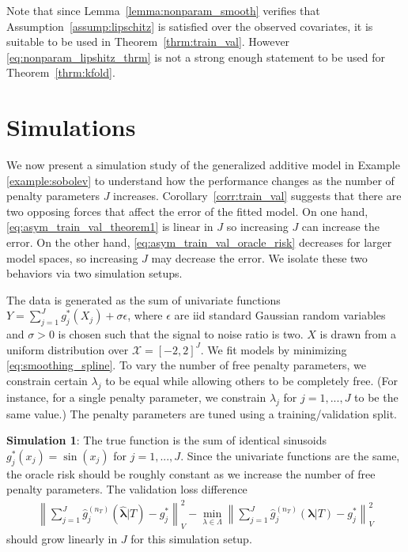 \documentclass[12pt]{article} %
\theoremstyle{definition}
\begin{document}
\noindent Note that since Lemma~\ref{lemma:nonparam_smooth} verifies that Assumption~\ref{assump:lipschitz} is satisfied over the observed covariates, it is suitable to be used in Theorem~\ref{thrm:train_val}.
However \eqref{eq:nonparam_lipshitz_thrm} is not a strong enough statement to be used for Theorem~\ref{thrm:kfold}.
%

\section{Simulations}\label{sec:simulations}

We now present a simulation study of the generalized additive model in Example \ref{example:sobolev} to understand how the performance changes as the number of penalty parameters $J$ increases.
Corollary~\ref{corr:train_val} suggests that there are two opposing forces that affect the error of the fitted model.
On one hand, \eqref{eq:asym_train_val_theorem1} is linear in $J$ so increasing $J$ can increase the error.
On the other hand, \eqref{eq:asym_train_val_oracle_risk} decreases for larger model spaces, so increasing $J$ may decrease the error.
We isolate these two behaviors via two simulation setups.

The data is generated as the sum of univariate functions
$Y = \sum_{j=1}^J g_j^*(X_j) + \sigma \epsilon$,
where $\epsilon$ are iid standard Gaussian random variables and $\sigma > 0$ is chosen such that the signal to noise ratio is two. $X$ is drawn from a uniform distribution over $\mathcal{X} = [-2, 2]^J$.
We fit models by minimizing \eqref{eq:smoothing_spline}.
To vary the number of free penalty parameters, we constrain certain $\lambda_j$ to be equal while allowing others to be completely free.
(For instance, for a single penalty parameter, we constrain $\lambda_j$ for $j=1,...,J$ to be the same value.) 
The penalty parameters are tuned using a training/validation split.

\noindent \textbf{Simulation 1}: The true function is the sum of identical sinusoids
$g_j^*(x_j) = \sin(x_j)$ for $j = 1,...,J$.
Since the univariate functions are the same, the oracle risk should be roughly constant as we increase the number of free penalty parameters.
The validation loss difference
\begin{align}
\left \| \sum_{j=1}^J \hat{g}^{(n_T)}_j(\hat{\boldsymbol{\lambda}}|T) - g^*_j \right \|_V^2 - 
\min_{\lambda \in \Lambda}
\left \| \sum_{j=1}^J \hat{g}^{(n_T)}_j(\boldsymbol{\lambda} | T) - g^*_j \right \|_V^2
\label{eq:excess_risk_sim}
\end{align}
should grow linearly in $J$ for this simulation setup.
\end{document}
